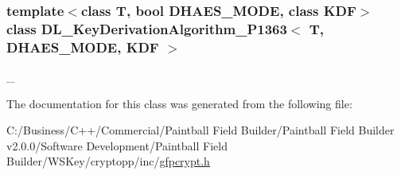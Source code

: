 \subsubsection*{template$<$class T, bool DHAES\_\-MODE, class KDF$>$ class DL\_\-KeyDerivationAlgorithm\_\-P1363$<$ T, DHAES\_\-MODE, KDF $>$}

\_\- 

The documentation for this class was generated from the following file:\begin{DoxyCompactItemize}
\item 
C:/Business/C++/Commercial/Paintball Field Builder/Paintball Field Builder v2.0.0/Software Development/Paintball Field Builder/WSKey/cryptopp/inc/\hyperlink{gfpcrypt_8h}{gfpcrypt.h}\end{DoxyCompactItemize}
